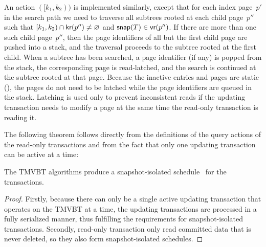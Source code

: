 An action $([k_1,k_2))$ is implemented similarly,
except that for each index page~$p'$ in the search path we need to
traverse all subtrees rooted at each child page~$p''$ such that
$[k_1,k_2) \cap \text{\textsf{kr}}(p'') \neq \varnothing$ and $\text{\textsf{snap}}(T) \in \text{\textsf{vr}}(p'')$.
If there are more than one such child page~$p''$, then the page identifiers
of all but the first child page are pushed into a stack, and the traversal
proceeds to the subtree rooted at the first child.
When a subtree has been searched, a page identifier (if any) is popped from
the stack, the corresponding page is read-latched, and the search is
continued at the subtree rooted at that page.
Because the inactive entries and pages are static
(), the pages do not need to be
latched while the page identifiers are queued in the stack.
Latching is used only to prevent inconsistent reads if the updating
transaction needs to modify a page at the same time the read-only transaction
is reading it.

The following theorem follows directly from the definitions of the query
actions of the read-only transactions and from the fact that only one
updating transaction can be active at a time:

\thmskip
\begin{theorem}
\label{theorem:tmvbt:serializable} 
The TMVBT algorithms produce a
snapshot-isolated schedule~\cite{berenson:1995:sql-critique} for the
transactions.
\end{theorem}
\begin{proof}
Firstly, because there can only be a single active updating transaction that
operates on the TMVBT at a time, the updating transactions are processed in a
fully serialized manner, thus fulfilling the requirements for
snapshot-isolated transactions. 
Secondly, read-only transaction only read committed data that is never deleted,
so they also form snapshot-isolated schedules.
\end{proof}
\thmskip

